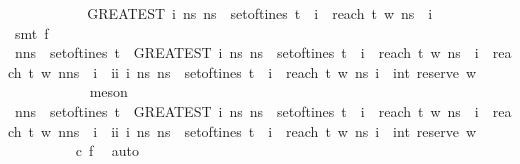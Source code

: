 \begin{isabellebody}
\ \ \ \ \ \ \ \ \isamarkupfalse%
\ \isamarkupfalse%
\ {\isachardoublequoteopen}{\isacharparenleft}GREATEST\ i{\isachardot}\ {\isasymexists}ns{\isachardot}\ ns\ {\isasymin}\ set{\isacharunderscore}of{\isacharunderscore}tines\ t\ {\isasymand}\ i\ {\isacharequal}\ reach\ t\ w\ ns{\isacharparenright}\ {\isacharequal}\ i{\isachardoublequoteclose}\isanewline
\ \ \ \ \ \ \ \ \ \ \isamarkupfalse%
\ {\isacharparenleft}smt\ f{}{\isacharparenright}\isanewline
\ \ \ \ \ \ \ \ \ \ \ \isanewline
\ \ \ \ \ \ \ \ \isamarkupfalse%
\ \isamarkupfalse%
\ {\isachardoublequoteopen}nns\ {\isasymnotin}\ set{\isacharunderscore}of{\isacharunderscore}tines\ t\ {\isasymor}\ {\isacharparenleft}GREATEST\ i{\isachardot}\ {\isasymexists}ns{\isachardot}\ ns\ {\isasymin}\ set{\isacharunderscore}of{\isacharunderscore}tines\ t\ {\isasymand}\ i\ {\isacharequal}\ reach\ t\ w\ ns{\isacharparenright}\ {\isacharequal}\ i\ {\isasymor}\ reach\ t\ w\ nns\ {\isasymnoteq}\ i\ {\isasymor}\ ii\ {\isacharparenleft}{\isasymlambda}i{\isachardot}\ {\isasymexists}ns{\isachardot}\ ns\ {\isasymin}\ set{\isacharunderscore}of{\isacharunderscore}tines\ t\ {\isasymand}\ i\ {\isacharequal}\ reach\ t\ w\ ns{\isacharparenright}\ i\ {\isacharequal}\ int\ {\isacharparenleft}reserve\ w\ {\isacharbrackleft}{\isacharbrackright}{\isacharparenright}{\isachardoublequoteclose}\isanewline
\ \ \ \ \ \ \ \ \ \ \isamarkupfalse%
\ meson\ \isacommand{{\isacharbraceright}}\isamarkupfalse%
\isanewline
\ \ \ \ \ \ \isamarkupfalse%
\ \isamarkupfalse%
\ {\isachardoublequoteopen}nns\ {\isasymnotin}\ set{\isacharunderscore}of{\isacharunderscore}tines\ t\ {\isasymor}\ {\isacharparenleft}GREATEST\ i{\isachardot}\ {\isasymexists}ns{\isachardot}\ ns\ {\isasymin}\ set{\isacharunderscore}of{\isacharunderscore}tines\ t\ {\isasymand}\ i\ {\isacharequal}\ reach\ t\ w\ ns{\isacharparenright}\ {\isacharequal}\ i\ {\isasymor}\ reach\ t\ w\ nns\ {\isasymnoteq}\ i\ {\isasymor}\ ii\ {\isacharparenleft}{\isasymlambda}i{\isachardot}\ {\isasymexists}ns{\isachardot}\ ns\ {\isasymin}\ set{\isacharunderscore}of{\isacharunderscore}tines\ t\ {\isasymand}\ i\ {\isacharequal}\ reach\ t\ w\ ns{\isacharparenright}\ i\ {\isacharequal}\ int\ {\isacharparenleft}reserve\ w\ {\isacharbrackleft}{\isacharbrackright}{\isacharparenright}{\isachardoublequoteclose}\isanewline
\ \ \ \ \ \ \ \ \isamarkupfalse%
\ c\ f{}\ \isamarkupfalse%
\ auto\ \isacommand{{\isacharbraceright}}\isamarkupfalse%

\end{isabellebody}
